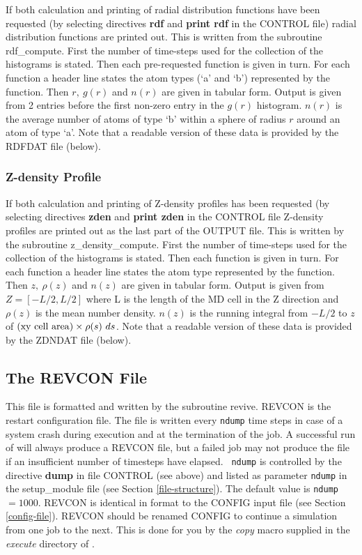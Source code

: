 If both calculation and printing of radial distribution functions
have been requested (by selecting directives {\bf rdf} and {\bf
print rdf} in the CONTROL file) radial distribution functions are
printed out.  This is written from the subroutine {\sc
rdf\_compute}.  First the number of time-steps used for the
collection of the histograms is stated.  Then each pre-requested
function is given in turn.  For each function a header line states
the atom types (`a' and `b') represented by the function.  Then
$r,~g(r)$ and $n(r)$ are given in tabular form.  Output is given
from 2 entries before the first non-zero entry in the $g(r)$
histogram.  $n(r)$ is the average number of atoms of type `b' within
a sphere of radius $r$ around an atom of type `a'.
Note that a readable version of these data is provided by the
RDFDAT file (below).

\subsubsection{Z-density Profile}

If both calculation and printing of Z-density profiles has been
requested (by selecting directives {\bf zden} and {\bf print zden}
in the CONTROL file Z-density profiles are printed out as the last
part of the OUTPUT file.  This is written by the subroutine {\sc
z\_density\_compute}.  First the number of time-steps used for the
collection of the histograms is stated.  Then each function is given
in turn.  For each function a header line states the atom type
represented by the function.  Then $z,~\rho(z)$ and $n(z)$ are given
in tabular form. Output is given from $Z = [-L/2,L/2]$ where L is
the length of the MD cell in the Z direction and $\rho(z)$ is the
mean number density.  $n(z)$ is the running integral from $-L/2$ to
$z$ of $({\rm xy~cell~area}) \times \rho(s)~ds$.
Note that a readable version of these data is provided by the
ZDNDAT file (below).

\subsection{The REVCON File}
\label{revcon-file}

This file is formatted and written by the subroutine {\sc revive}.
REVCON is the restart configuration file.  The file is written every
{\tt ndump} time steps in case of a system crash during execution
and at the termination of the job.  A successful run of \D will
always produce a REVCON file, but a failed job may not produce the
file if an insufficient number of timesteps have elapsed.  {\tt
ndump} is controlled by the directive {\bf dump} in file CONTROL
(see above) and listed as parameter {\tt ndump} in the {\sc
setup\_module} file (see Section \ref{file-structure}). The default
value is {\tt ndump} $=1000$.  REVCON is identical in format to the
CONFIG input file (see Section \ref{config-file}).  REVCON should be
renamed CONFIG to continue a simulation from one job to the next.
This is done for you by the {\sl copy} macro supplied in the {\em
execute} directory of \D.

